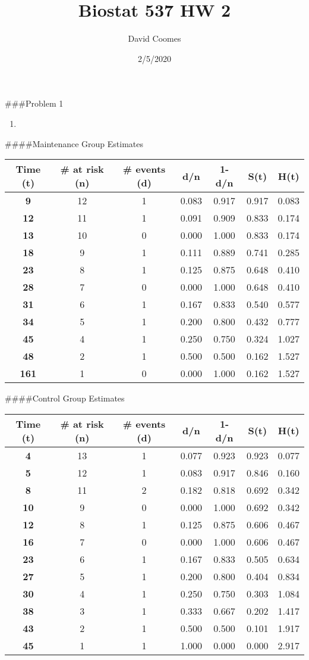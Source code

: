 \documentclass[
]{article}
\title{Biostat 537 HW 2}
\author{David Coomes}
\date{2/5/2020}
\begin{document}
\maketitle

\#\#\#Problem 1

\begin{enumerate}
\def\labelenumi{(\alph{enumi})}
\item
\end{enumerate}

\#\#\#\#Maintenance Group Estimates

\begin{tabular}{>{\bfseries}c||c|c|c|c|c|c}
\hline
Time (t) & \# at risk (n) & \# events (d) & d/n & 1-d/n & S(t) & H(t)\\
\hline
9 & 12 & 1 & 0.083 & 0.917 & 0.917 & 0.083\\
\hline
12 & 11 & 1 & 0.091 & 0.909 & 0.833 & 0.174\\
\hline
13 & 10 & 0 & 0.000 & 1.000 & 0.833 & 0.174\\
\hline
18 & 9 & 1 & 0.111 & 0.889 & 0.741 & 0.285\\
\hline
23 & 8 & 1 & 0.125 & 0.875 & 0.648 & 0.410\\
\hline
28 & 7 & 0 & 0.000 & 1.000 & 0.648 & 0.410\\
\hline
31 & 6 & 1 & 0.167 & 0.833 & 0.540 & 0.577\\
\hline
34 & 5 & 1 & 0.200 & 0.800 & 0.432 & 0.777\\
\hline
45 & 4 & 1 & 0.250 & 0.750 & 0.324 & 1.027\\
\hline
48 & 2 & 1 & 0.500 & 0.500 & 0.162 & 1.527\\
\hline
161 & 1 & 0 & 0.000 & 1.000 & 0.162 & 1.527\\
\hline
\end{tabular}

\#\#\#\#Control Group Estimates

\begin{tabular}{>{\bfseries}c||c|c|c|c|c|c}
\hline
Time (t) & \# at risk (n) & \# events (d) & d/n & 1-d/n & S(t) & H(t)\\
\hline
4 & 13 & 1 & 0.077 & 0.923 & 0.923 & 0.077\\
\hline
5 & 12 & 1 & 0.083 & 0.917 & 0.846 & 0.160\\
\hline
8 & 11 & 2 & 0.182 & 0.818 & 0.692 & 0.342\\
\hline
10 & 9 & 0 & 0.000 & 1.000 & 0.692 & 0.342\\
\hline
12 & 8 & 1 & 0.125 & 0.875 & 0.606 & 0.467\\
\hline
16 & 7 & 0 & 0.000 & 1.000 & 0.606 & 0.467\\
\hline
23 & 6 & 1 & 0.167 & 0.833 & 0.505 & 0.634\\
\hline
27 & 5 & 1 & 0.200 & 0.800 & 0.404 & 0.834\\
\hline
30 & 4 & 1 & 0.250 & 0.750 & 0.303 & 1.084\\
\hline
38 & 3 & 1 & 0.333 & 0.667 & 0.202 & 1.417\\
\hline
43 & 2 & 1 & 0.500 & 0.500 & 0.101 & 1.917\\
\hline
45 & 1 & 1 & 1.000 & 0.000 & 0.000 & 2.917\\
\hline
\end{tabular}
\end{document}
